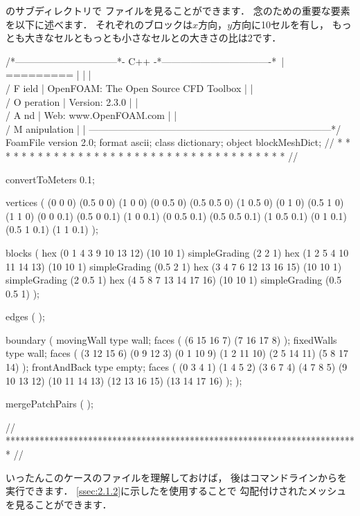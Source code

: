 のサブディレクトリで
ファイルを見ることができます．
念のための重要な要素を以下に述べます．
それぞれのブロックは$x$方向，$y$方向に10セルを有し，
もっとも大きなセルともっとも小さなセルとの大きさの比は2です．
\begin{OFverbatim}[file, linenum=17]
/*--------------------------------*- C++ -*----------------------------------*\
| =========                 |                                                 |
| \\      /  F ield         | OpenFOAM: The Open Source CFD Toolbox           |
|  \\    /   O peration     | Version:  2.3.0                                 |
|   \\  /    A nd           | Web:      www.OpenFOAM.com                      |
|    \\/     M anipulation  |                                                 |
\*---------------------------------------------------------------------------*/
FoamFile
{
    version     2.0;
    format      ascii;
    class       dictionary;
    object      blockMeshDict;
}
// * * * * * * * * * * * * * * * * * * * * * * * * * * * * * * * * * * * * * //

convertToMeters 0.1;

vertices        
(
    (0 0 0)
    (0.5 0 0)
    (1 0 0)
    (0 0.5 0)
    (0.5 0.5 0)
    (1 0.5 0)
    (0 1 0)
    (0.5 1 0)
    (1 1 0)
    (0 0 0.1)
    (0.5 0 0.1)
    (1 0 0.1)
    (0 0.5 0.1)
    (0.5 0.5 0.1)
    (1 0.5 0.1)
    (0 1 0.1)
    (0.5 1 0.1)
    (1 1 0.1)
);

blocks          
(
    hex (0 1 4 3 9 10 13 12) (10 10 1) simpleGrading (2 2 1)
    hex (1 2 5 4 10 11 14 13) (10 10 1) simpleGrading (0.5 2 1)
    hex (3 4 7 6 12 13 16 15) (10 10 1) simpleGrading (2 0.5 1)
    hex (4 5 8 7 13 14 17 16) (10 10 1) simpleGrading (0.5 0.5 1)
);

edges           
(
);

boundary
(
    movingWall
    {
        type wall;
        faces
        (
            (6 15 16 7)
            (7 16 17 8)
        );
    }
    fixedWalls
    {
        type wall;
        faces
        (
            (3 12 15 6)
            (0 9 12 3)
            (0 1 10 9)
            (1 2 11 10)
            (2 5 14 11)
            (5 8 17 14)
        );
    }
    frontAndBack
    {
        type empty;
        faces
        (
            (0 3 4 1)
            (1 4 5 2)
            (3 6 7 4)
            (4 7 8 5)
            (9 10 13 12)
            (10 11 14 13)
            (12 13 16 15)
            (13 14 17 16)
        );
    }
);

mergePatchPairs
(
);

// ************************************************************************* //
\end{OFverbatim}
いったんこのケースのファイルを理解しておけば，
後はコマンドラインからを実行できます．
\autoref{ssec:2.1.2}に示したを使用することで
勾配付けされたメッシュを見ることができます．

